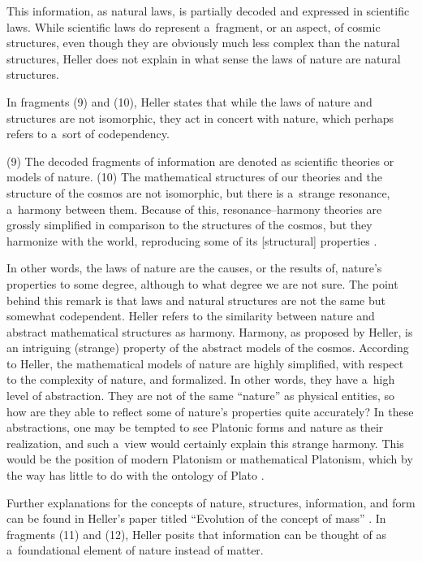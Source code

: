 This information, as natural laws, is partially decoded and expressed in scientific laws. While scientific laws do represent a~fragment, or an aspect, of cosmic structures, even though they are obviously much less complex than the natural structures, Heller does not explain in what sense the laws of nature are natural structures.



In fragments (9) and (10), Heller states that while the laws of nature and structures are not isomorphic, they act in concert with nature, which perhaps refers to a~sort of codependency.



(9) The decoded fragments of information are denoted as scientific theories or models of nature. (10) The mathematical structures of our theories and the structure of the cosmos are not isomorphic, but there is a~strange resonance, a~harmony between them. Because of this, resonance–harmony theories are grossly simplified in comparison to the structures of the cosmos, but they harmonize with the world, reproducing some of its [structural] properties 
\parencite[][p.170]{heller_nauka_1995}.%




In other words, the laws of nature are the causes, or the results of, nature's properties to some degree, although to what degree we are not sure. The point behind this remark is that laws and natural structures are not the same but somewhat codependent. Heller refers to the similarity between nature and abstract mathematical structures as harmony. Harmony, as proposed by Heller, is an intriguing (strange) property of the abstract models of the cosmos. According to Heller, the mathematical models of nature are highly simplified, with respect to the complexity of nature, and formalized. In other words, they have a~high level of abstraction. They are not of the same ``nature'' as physical entities, so how are they able to reflect some of nature's properties quite accurately? In these abstractions, one may be tempted to see Platonic forms and nature as their realization, and such a~view would certainly explain this strange harmony. This would be the position of modern Platonism or mathematical Platonism, which by the way has little to do with the ontology of Plato 
\parencite[e.g][]{linnebo_platonism_2018}.%




Further explanations for the concepts of nature, structures, information, and form can be found in Heller's paper titled ``Evolution of the concept of mass'' 
\parencite[][]{heller_ewolucja_1987}. %
 In fragments (11) and (12), Heller posits that information can be thought of as a~foundational element of nature instead of matter.



